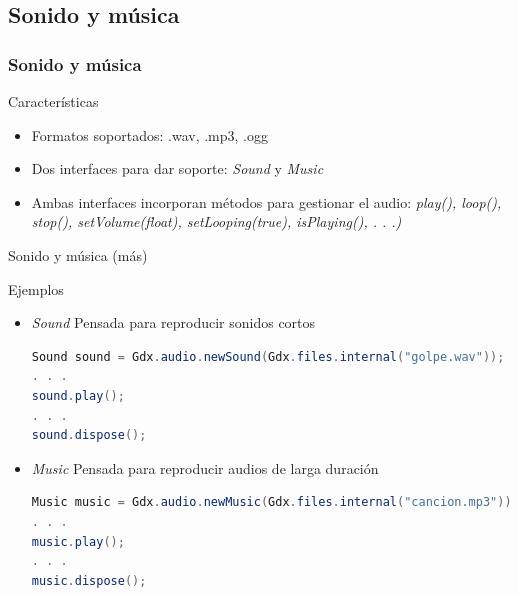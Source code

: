 \documentclass[xcolor={dvipsnames}]{beamer}
\begin{document}
\subsection{Sonido y música}
\begin{frame}[fragile]\frametitle{Sonido y música}
	\begin{block}{Características}
	\begin{itemize}
		\item Formatos soportados: .wav, .mp3, .ogg
		\item Dos interfaces para dar soporte: \emph{Sound} y \emph{Music}
		\item Ambas interfaces incorporan métodos para gestionar el audio: \emph{play(), loop(), stop(), setVolume(float), setLooping(true), isPlaying(), . . .)}
	\end{itemize}
	\end{block}
\end{frame}

\begin{frame}[fragile]{Sonido y música (más)}
	\begin{exampleblock}{Ejemplos}
	\begin{itemize}
		\item \emph{\textcolor{resalta}{Sound}} Pensada para reproducir sonidos cortos
			\begin{lstlisting}[language=java]
Sound sound = Gdx.audio.newSound(Gdx.files.internal("golpe.wav"));
. . .
sound.play();
. . .
sound.dispose();
			\end{lstlisting}
		\item \emph{\textcolor{resalta}{Music}} Pensada para reproducir audios de larga duración
			\begin{lstlisting}[language=java]
Music music = Gdx.audio.newMusic(Gdx.files.internal("cancion.mp3"));
. . .
music.play();
. . .
music.dispose();
			\end{lstlisting}
	\end{itemize}
	\end{exampleblock}
\end{frame}
\end{document}

